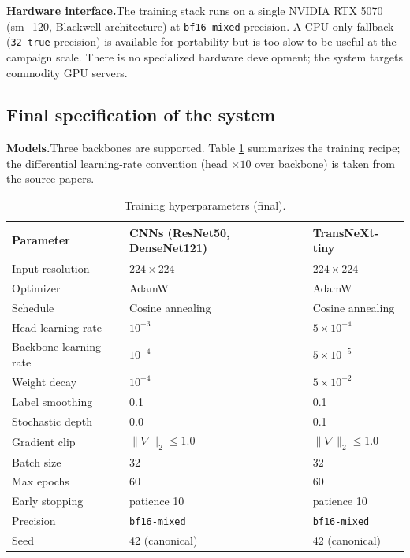 \textbf{Hardware interface.}\quad The training stack runs on a single NVIDIA
RTX 5070 (sm\_120, Blackwell architecture) at \texttt{bf16-mixed} precision.
A CPU-only fallback (\texttt{32-true} precision) is available for portability
but is too slow to be useful at the campaign scale. There is no specialized
hardware development; the system targets commodity GPU servers.

\subsection{Final specification of the system}
\textbf{Models.}\quad Three backbones are supported. Table \ref{tab:hparams}
summarizes the training recipe; the differential learning-rate convention
(head $\times 10$ over backbone) is taken from the source papers.

\begin{table}[htbp]
\centering
\caption{Training hyperparameters (final).}
\label{tab:hparams}
\setlength{\tabcolsep}{4pt}
\renewcommand{\arraystretch}{1.1}
\begin{tabular}{lll}
\toprule
Parameter & CNNs (ResNet50, DenseNet121) & TransNeXt-tiny \\
\midrule
Input resolution        & $224 \times 224$        & $224 \times 224$ \\
Optimizer               & AdamW \cite{loshchilov2019adamw} & AdamW \\
Schedule                & Cosine annealing        & Cosine annealing \\
Head learning rate      & $10^{-3}$               & $5 \times 10^{-4}$ \\
Backbone learning rate  & $10^{-4}$               & $5 \times 10^{-5}$ \\
Weight decay            & $10^{-4}$               & $5 \times 10^{-2}$ \\
Label smoothing         & 0.1                     & 0.1 \\
Stochastic depth        & 0.0                     & 0.1 \\
Gradient clip           & $\|\nabla\|_2 \leq 1.0$ & $\|\nabla\|_2 \leq 1.0$ \\
Batch size              & 32                      & 32 \\
Max epochs              & 60                      & 60 \\
Early stopping          & patience 10             & patience 10 \\
Precision               & \texttt{bf16-mixed}     & \texttt{bf16-mixed} \\
Seed                    & 42 (canonical)          & 42 (canonical) \\
\bottomrule
\end{tabular}
\end{table}

